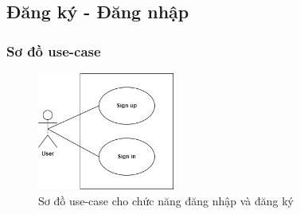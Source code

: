 \subsection{Đăng ký - Đăng nhập}
\subsubsection{Sơ đồ use-case}
\begin{figure}[H]
    \centering
    \includegraphics[width=0.4\textwidth]{Images/UseCase/Auth.png}
    \caption{Sơ đồ use-case cho chức năng đăng nhập và đăng ký}
\end{figure}
\newpage
